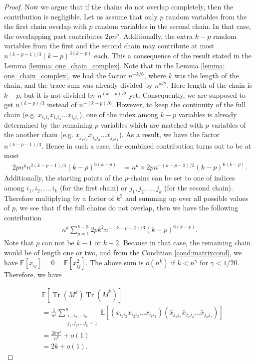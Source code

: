 \documentclass[12pt]{amsart}
\theoremstyle{plain}
\theoremstyle{definition}
\newcommand{\Tr}{\operatorname{Tr}}
\begin{document}
\begin{proof}
Now we argue that if the chains do not overlap completely, then the contribution is negligible. Let us assume that only $p$ random variables from the the first chain overlap with $p$ random variables in the second chain. In that case, the overlapping part contributes $2pn^{p}$. Additionally, the extra $k-p$ random variables from the first and the second chain may contribute at most $n^{(k-p-1)/3}(k-p)^{3(k-p)}$ each. This a consequence of the result stated in the Lemma \ref{lemma: one_chain_complex}. Note that in the Lemma \ref{lemma: one_chain_complex}, we had the factor $n^{-k/6}$, where $k$ was the length of the chain, and the trace sum was already divided by $n^{k/2}$. Here length of the chain is $k-p$, but it is not divided by $n^{(k-p)/2}$ yet. Consequently, we are supposed to get $n^{(k-p)/3}$ instead of $n^{-(k-p)/6}.$ However, to keep the continuity of the full chain (e.g. $x_{i_{1}i_{2}}x_{i_{2}i_{3}}\dots x_{i_{k}i_{1}}$), one of the index among $k-p$ variables is already determined by the remaining $p$ variables which are matched with $p$ variables of the another chain (e.g. $x_{j_{1}j_{2}}x_{j_{2}j_{3}}\dots x_{j_{k}j_{1}}$). As a result, we have the factor $n^{(k-p-1)/3}.$ Hence in such a case, the combined contribution turns out to be at most 
\begin{align}\label{eqn: negligible terms in cross chain merging (part 1)}
    2pn^{p}n^{2(k-p-1)/3}(k-p)^{6(k-p)}&=n^{k} \times 2pn^{-(k-p-2)/3}(k-p)^{6(k-p)}.
\end{align}
Additionally, the starting points of the $p$-chains can be set to one of indices among $i_{1}, i_{2}, \ldots, i_{k}$ (for the first chain) or $j_{1}, j_{2}, \ldots, j_{k}$ (for the second chain). Therefore multiplying by a factor of $k^{2}$ and summing up over all possible values of $p$, we see that if the full chains do not overlap, then we have the following contribution
\begin{align}\label{eqn: negligible terms in cross chain merging}
    n^{k}\sum_{p=1}^{k-3}2pk^{2}n^{-(k-p-2)/3}(k-p)^{6(k-p)}.
\end{align}
Note that $p$ can not be $k-1$ or $k-2$. Because in that case, the remaining chain would be of length one or two, and from the Condition \ref{cond:matrixcond}, we have $\mathbb{E}[x_{ij}] = 0 = \mathbb{E}[x_{ij}^{2}].$ The above sum is $o(n^{k})$ if $k<n^{\gamma}$ for $\gamma< 1/20.$
Therefore, we have

\begin{align*}
    &\mathbb{E}[\Tr(M^{k})\Tr(\bar{M}^{k})]\\
    &=\frac{1}{n^k}\sum_{\substack{i_{1},i_{2},\dots i_{k},\\  j_{1}, j_{2}, \dots j_{k}=1}}^{n} \mathbb{E}\left[(x_{i_{1}i_{2}}x_{i_{2}i_{3}}\dots x_{i_{k}i_{1}})(\bar{x}_{j_{1}j_{2}}\bar{x}_{j_{2}j_{3}}\dots \bar{x}_{j_{k}j_{1}})\right]\\
    &=\frac{2kn^{k}}{n^{k}}+o(1)\\
    &=2k+o(1).
\end{align*}
\end{proof} 
\end{document}
